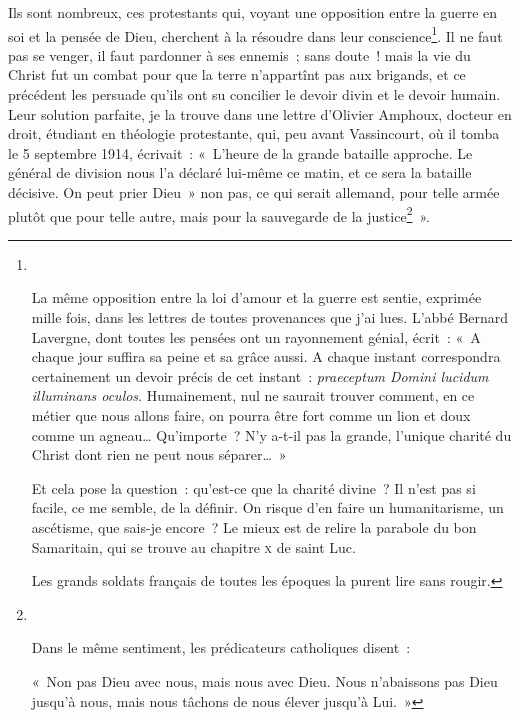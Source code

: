 \documentclass[french,twoside]{book} %
\begin{document}
Ils sont nombreux, ces protestants qui, voyant une opposition entre la guerre en soi et la pensée de Dieu, cherchent à la résoudre dans leur conscience\footnote{ ‌\par
 La même opposition entre la loi d’amour et la guerre est sentie, exprimée mille fois, dans les lettres de toutes provenances que j’ai lues. L’abbé Bernard Lavergne, dont toutes les pensées ont un rayonnement génial, écrit : « A chaque jour suffira sa peine et sa grâce aussi. A chaque instant correspondra certainement un devoir précis de cet instant : {\itshape praeceptum Domini lucidum illuminans oculos}. Humainement, nul ne saurait trouver comment, en ce métier que nous allons faire, on pourra être fort comme un lion et doux comme un agneau… Qu’importe ? N’y a-t-il pas la grande, l’unique charité du Christ dont rien ne peut nous séparer… »‌\par
 Et cela pose la question : qu’est-ce que la charité divine ? Il n’est pas si facile, ce me semble, de la définir. On risque d’en faire un humanitarisme, un ascétisme, que sais-je encore ? Le mieux est de relire la parabole du bon Samaritain, qui se trouve au chapitre \textsc{x} de saint Luc.‌\par
 Les grands soldats français de toutes les époques la purent lire sans rougir.
 }. Il ne faut pas se venger, il faut pardonner à ses ennemis ; sans doute ! mais la vie du Christ fut un combat pour que la terre n’appartînt pas aux brigands, et ce précédent les persuade qu’ils ont su concilier le devoir divin et le devoir humain. Leur solution parfaite, je la trouve dans une lettre d’Olivier Amphoux, docteur en droit, étudiant en théologie protestante, qui, peu avant Vassincourt, où il tomba le 5 septembre 1914, écrivait : « L’heure de la grande bataille approche. Le général de division nous l’a déclaré lui-même ce matin, et ce sera la bataille décisive. On peut prier Dieu » non pas, ce qui serait allemand, pour telle armée plutôt que pour telle autre, mais pour la sauvegarde de la justice\footnote{‌\par
 Dans le même sentiment, les prédicateurs catholiques disent :‌\par
  \noindent « Non pas Dieu avec nous, mais nous avec Dieu. Nous n’abaissons pas Dieu jusqu’à nous, mais nous tâchons de nous élever jusqu’à Lui. »
 } ».‌\par
\end{document}
